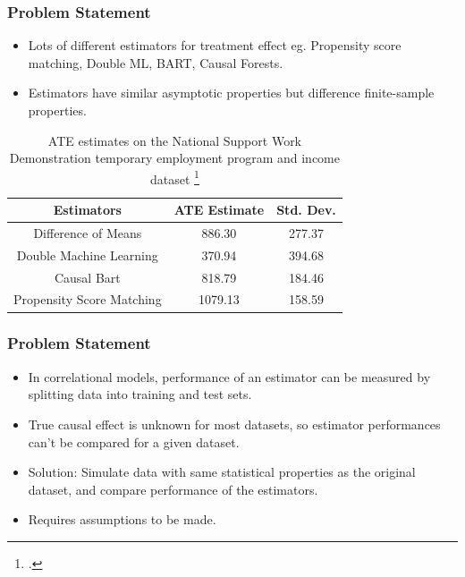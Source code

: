 \documentclass{beamer}
\begin{document}
\begin{frame}
	\frametitle{Problem Statement}
	\begin{itemize}
		\item Lots of different estimators for treatment effect eg. Propensity score matching, Double ML, BART, Causal Forests. 
		\item Estimators have similar asymptotic properties but difference finite-sample properties.
	\end{itemize}
	\begin{table}[h!]
		\centering
		\begin{tabularx}{\textwidth}{||c c c||} 
		 \hline
		 \textbf{Estimators}  & \textbf{ATE Estimate} & \textbf{Std. Dev.} \\
		 \hline\hline
		 Difference of Means & 886.30 & 277.37 \\ 
		 Double Machine Learning & 370.94 & 394.68 \\
		 Causal Bart & 818.79 & 184.46 \\
		 Propensity Score Matching & 1079.13 & 158.59 \\
		 \hline
		\end{tabularx}
		\caption*{ATE estimates on the National Support Work Demonstration temporary employment program and income dataset \footcite{parikh2022evaluating}}
		\label{table:estimates}
	\end{table}
\end{frame}

\begin{frame}
	\frametitle{Problem Statement}
	\begin{itemize}
		\item In correlational models, performance of an estimator can be measured by
			splitting data into training and test sets.
		\item True causal effect is unknown for most datasets, so estimator performances
			can't be compared for a given dataset.
		\item Solution: Simulate data with same statistical properties as the original dataset, and compare performance of the estimators.
		\item Requires assumptions to be made. 
	\end{itemize}
\end{frame}
\end{document}

